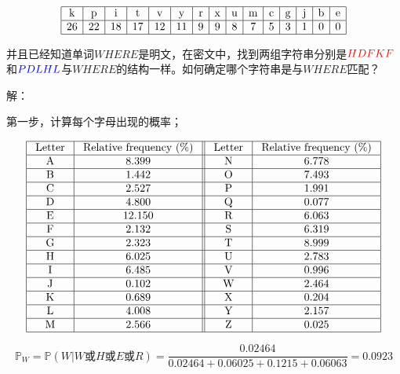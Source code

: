 \documentclass{article}
\begin{document}
$$
\begin{array}{|c|c|c|c|c|c|c|c|c|c|c|c|c|c|c|}
\hline \mathrm{k} & \mathrm{p} & \mathrm{i} & \mathrm{t} & \mathrm{v} & \mathrm{y} & \mathrm{r} & \mathrm{x} & \mathrm{u} & \mathrm{m} & \mathrm{c} & \mathrm{g} & \mathrm{j} & \mathrm{b} & \mathrm{e} \\
\hline 26 & 22 & 18 & 17 & 12 & 11 & 9 & 9 & 8 & 7 & 5 & 3 & 1 & 0 & 0 \\
\hline
\end{array}
$$

并且已经知道单词\textbf{$WHERE$}是明文，在密文中，找到两组字符串分别是\textbf{$\color{red}{HDFKF}$}和\textbf{$\color{blue}{PDLHL}$}与\textbf{$WHERE$}的结构一样。如何确定哪个字符串是与\textbf{$WHERE$}匹配？

解：

第一步，计算每个字母出现的概率；

$$
\begin{array}{|c|c||c|c|}
\hline \text { Letter } & \text { Relative  frequency (\%) } & \text { Letter } & \text { Relative  frequency (\%) } \\
\hline \text { A } & 8.399 & \text { N } & 6.778 \\
\hline \text { B } & 1.442 & \text { O } & 7.493 \\
\hline \text { C } & 2.527 & \text { P } & 1.991 \\
\hline \text { D } & 4.800 & \text { Q } & 0.077 \\
\hline \text { E } & 12.150 & \text { R } & 6.063 \\
\hline \text { F } & 2.132 & \text { S } & 6.319 \\
\hline \text { G } & 2.323 & \text { T } & 8.999 \\
\hline \text { H } & 6.025 & \text { U } & 2.783 \\
\hline \text { I } & 6.485 & \text { V } & 0.996 \\
\hline \text { J } & 0.102 & \text { W } & 2.464 \\
\hline \text { K } & 0.689 & \text { X } & 0.204 \\
\hline \text { L } & 4.008 & \text { Y } & 2.157 \\
\hline \text { M } & 2.566 & \text { Z } & 0.025 \\
\hline
\end{array}
$$


$$\mathbb{P}_W = \mathbb{P}(W|W\mbox{或}H\mbox{或}E\mbox{或}R)= \frac{0.02464}{0.02464+0.06025+0.1215+0.06063}=0.0923$$
\end{document}
